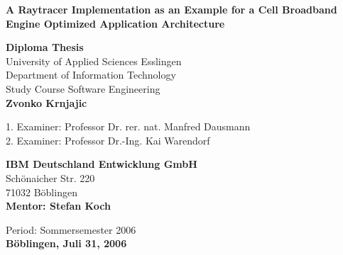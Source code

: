 \documentclass[DIV10, abstracton, openright, footsepline, headsepline, twoside, 9pt,
bigheadings]{scrreprt}
\begin{document}




\setcounter{secnumdepth}{4}


\begin{titlepage}
\begin{center}
\huge
\textbf{\textcolor{Bigblue}{\textsf{A Raytracer Implementation as an Example for a Cell
Broadband Engine Optimized
Application Architecture}}}
\normalsize
\vspace*{2cm}

\textbf{\textcolor{Bigblue}{\textsf{Diploma Thesis}}}\\
\vspace*{0.2cm}
University of Applied Sciences Esslingen\\
\vspace*{0.1cm}
Department of Information Technology\\
Study Course Software Engineering\\
\vspace*{1.5cm}
\textbf{\textcolor{Bigblue}{\textsf{Zvonko Krnjajic}}}
\vspace*{0.5cm}
\end{center}
\hspace*{2cm} 1. Examiner:\hspace*{0.5cm} Professor Dr. rer. nat. Manfred
Dausmann\\
\hspace*{2cm} 2. Examiner:\hspace*{0.5cm} Professor Dr.-Ing. Kai Warendorf
\vspace*{0.5cm}
\begin{center}
\textbf{\textcolor{Bigblue}{\textsf{IBM Deutschland Entwicklung GmbH}}}\\
Sch\"onaicher Str. 220\\
71032 B\"oblingen\\
\vspace*{0.5cm}
\textbf{\textcolor{Bigblue}{\textsf{Mentor: Stefan Koch}}}
\end{center}
\vspace*{0.5cm}
\begin{center}
Period:  Sommersemester 2006\\
\vspace*{1cm}
\textbf{\textcolor{Bigblue}{\textsf{B\"oblingen, Juli 31, 2006}}}

\end{center}
\end{titlepage}
\end{document}
